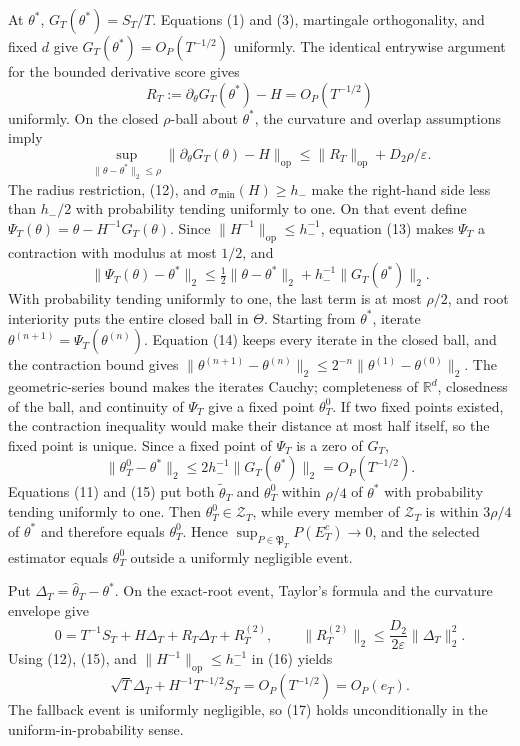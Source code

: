 At \(\theta^*\), \(G_T(\theta^*)=S_T/T\). Equations (1) and (3), martingale orthogonality, and fixed \(d\) give \(G_T(\theta^*)=O_P(T^{-1/2})\) uniformly. The identical entrywise argument for the bounded derivative score gives
\[
 R_T:=\partial_\theta G_T(\theta^*)-H=O_P(T^{-1/2})
\tag{12}
\]
uniformly. On the closed \(\rho\)-ball about \(\theta^*\), the curvature and overlap assumptions imply
\[
 \sup_{\|\theta-\theta^*\|_2\le\rho}
 \|\partial_\theta G_T(\theta)-H\|_{\mathrm{op}}
 \le\|R_T\|_{\mathrm{op}}+D_2\rho/\varepsilon.
\tag{13}
\]
The radius restriction, (12), and \(\sigma_{\min}(H)\ge h_-\) make the right-hand side less than \(h_-/2\) with probability tending uniformly to one. On that event define \(\Psi_T(\theta)=\theta-H^{-1}G_T(\theta)\). Since \(\|H^{-1}\|_{\mathrm{op}}\le h_-^{-1}\), equation (13) makes \(\Psi_T\) a contraction with modulus at most \(1/2\), and
\[
 \|\Psi_T(\theta)-\theta^*\|_2
 \le\tfrac12\|\theta-\theta^*\|_2+h_-^{-1}\|G_T(\theta^*)\|_2.
\tag{14}
\]
With probability tending uniformly to one, the last term is at most \(\rho/2\), and root interiority puts the entire closed ball in \(\Theta\). Starting from \(\theta^*\), iterate \(\theta^{(n+1)}=\Psi_T(\theta^{(n)})\). Equation (14) keeps every iterate in the closed ball, and the contraction bound gives \(\|\theta^{(n+1)}-\theta^{(n)}\|_2\le2^{-n}\|\theta^{(1)}-\theta^{(0)}\|_2\). The geometric-series bound makes the iterates Cauchy; completeness of \(\mathbb R^d\), closedness of the ball, and continuity of \(\Psi_T\) give a fixed point \(\theta_T^0\). If two fixed points existed, the contraction inequality would make their distance at most half itself, so the fixed point is unique. Since a fixed point of \(\Psi_T\) is a zero of \(G_T\),
\[
 \|\theta_T^0-\theta^*\|_2
 \le2h_-^{-1}\|G_T(\theta^*)\|_2=O_P(T^{-1/2}).
\tag{15}
\]
Equations (11) and (15) put both \(\widetilde\theta_T\) and \(\theta_T^0\) within \(\rho/4\) of \(\theta^*\) with probability tending uniformly to one. Then \(\theta_T^0\in\mathcal Z_T\), while every member of \(\mathcal Z_T\) is within \(3\rho/4\) of \(\theta^*\) and therefore equals \(\theta_T^0\). Hence \(\sup_{P\in\mathfrak P_T}P(E_T^c)\to0\), and the selected estimator equals \(\theta_T^0\) outside a uniformly negligible event.

Put \(\Delta_T=\widehat\theta_T-\theta^*\). On the exact-root event, Taylor's formula and the curvature envelope give
\[
 0=T^{-1}S_T+H\Delta_T+R_T\Delta_T+R_T^{(2)},
 \qquad \|R_T^{(2)}\|_2\le\frac{D_2}{2\varepsilon}\|\Delta_T\|_2^2.
\tag{16}
\]
Using (12), (15), and \(\|H^{-1}\|_{\mathrm{op}}\le h_-^{-1}\) in (16) yields
\[
 \sqrt T\Delta_T+H^{-1}T^{-1/2}S_T
 =O_P(T^{-1/2})=O_P(e_T).
\tag{17}
\]
The fallback event is uniformly negligible, so (17) holds unconditionally in the uniform-in-probability sense.

